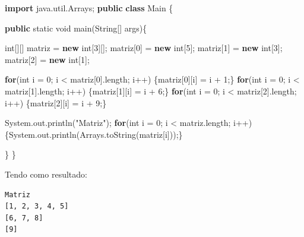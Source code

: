 \documentclass[
]{book}
\newenvironment{Shaded}{\begin{snugshade}}{\end{snugshade}}
\newcommand{\BuiltInTok}[1]{#1}
\newcommand{\DataTypeTok}[1]{\textcolor[rgb]{0.13,0.29,0.53}{#1}}
\newcommand{\DecValTok}[1]{\textcolor[rgb]{0.00,0.00,0.81}{#1}}
\newcommand{\FunctionTok}[1]{\textcolor[rgb]{0.00,0.00,0.00}{#1}}
\newcommand{\ImportTok}[1]{#1}
\newcommand{\KeywordTok}[1]{\textcolor[rgb]{0.13,0.29,0.53}{\textbf{#1}}}
\newcommand{\NormalTok}[1]{#1}
\newcommand{\StringTok}[1]{\textcolor[rgb]{0.31,0.60,0.02}{#1}}
\begin{document}
\begin{Shaded}
\begin{Highlighting}[]
\KeywordTok{import}\ImportTok{ java.util.Arrays;}
\KeywordTok{public} \KeywordTok{class}\NormalTok{ Main \{}

    \KeywordTok{public} \DataTypeTok{static} \DataTypeTok{void} \FunctionTok{main}\NormalTok{(}\BuiltInTok{String}\NormalTok{[] args)\{}
        
        \DataTypeTok{int}\NormalTok{[][] matriz = }\KeywordTok{new} \DataTypeTok{int}\NormalTok{[}\DecValTok{3}\NormalTok{][];}
\NormalTok{        matriz[}\DecValTok{0}\NormalTok{] = }\KeywordTok{new} \DataTypeTok{int}\NormalTok{[}\DecValTok{5}\NormalTok{];}
\NormalTok{        matriz[}\DecValTok{1}\NormalTok{] = }\KeywordTok{new} \DataTypeTok{int}\NormalTok{[}\DecValTok{3}\NormalTok{];}
\NormalTok{        matriz[}\DecValTok{2}\NormalTok{] = }\KeywordTok{new} \DataTypeTok{int}\NormalTok{[}\DecValTok{1}\NormalTok{];}

        \KeywordTok{for}\NormalTok{(}\DataTypeTok{int}\NormalTok{ i = }\DecValTok{0}\NormalTok{; i < matriz[}\DecValTok{0}\NormalTok{].}\FunctionTok{length}\NormalTok{; i++) \{matriz[}\DecValTok{0}\NormalTok{][i] = i + }\DecValTok{1}\NormalTok{;\}}
        \KeywordTok{for}\NormalTok{(}\DataTypeTok{int}\NormalTok{ i = }\DecValTok{0}\NormalTok{; i < matriz[}\DecValTok{1}\NormalTok{].}\FunctionTok{length}\NormalTok{; i++) \{matriz[}\DecValTok{1}\NormalTok{][i] = i + }\DecValTok{6}\NormalTok{;\}}
        \KeywordTok{for}\NormalTok{(}\DataTypeTok{int}\NormalTok{ i = }\DecValTok{0}\NormalTok{; i < matriz[}\DecValTok{2}\NormalTok{].}\FunctionTok{length}\NormalTok{; i++) \{matriz[}\DecValTok{2}\NormalTok{][i] = i + }\DecValTok{9}\NormalTok{;\}}

        \BuiltInTok{System}\NormalTok{.}\FunctionTok{out}\NormalTok{.}\FunctionTok{println}\NormalTok{(}\StringTok{"Matriz"}\NormalTok{);}
        \KeywordTok{for}\NormalTok{(}\DataTypeTok{int}\NormalTok{ i = }\DecValTok{0}\NormalTok{; i < matriz.}\FunctionTok{length}\NormalTok{; i++) \{}\BuiltInTok{System}\NormalTok{.}\FunctionTok{out}\NormalTok{.}\FunctionTok{println}\NormalTok{(}\BuiltInTok{Arrays}\NormalTok{.}\FunctionTok{toString}\NormalTok{(matriz[i]));\}}

\NormalTok{    \}}
\NormalTok{\}}
\end{Highlighting}
\end{Shaded}

Tendo como resultado:

\begin{verbatim}
Matriz
[1, 2, 3, 4, 5]
[6, 7, 8]
[9]
\end{verbatim}
\end{document}
